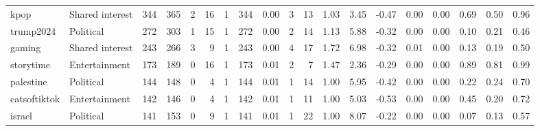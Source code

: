 \begin{tabular}{llrrrrrrrrrrrrrrrrr}
            kpop & Shared interest &    344 &    365 &                           2 &                           16 &             1 &                        344 &     0.00 &    3 &     13 & 1.03 &   3.45 &                              -0.47 &   0.00 &         0.00 &                                0.69 &                                   0.50 &                                     0.96 \\
       trump2024 &       Political &    272 &    303 &                           1 &                           15 &             1 &                        272 &     0.00 &    2 &     14 & 1.13 &   5.88 &                              -0.32 &   0.00 &         0.00 &                                0.10 &                                   0.21 &                                     0.46 \\
          gaming & Shared interest &    243 &    266 &                           3 &                            9 &             1 &                        243 &     0.00 &    4 &     17 & 1.72 &   6.98 &                              -0.32 &   0.01 &         0.00 &                                0.13 &                                   0.19 &                                     0.50 \\
       storytime &   Entertainment &    173 &    189 &                           0 &                           16 &             1 &                        173 &     0.01 &    2 &      7 & 1.47 &   2.36 &                              -0.29 &   0.00 &         0.00 &                                0.89 &                                   0.81 &                                     0.99 \\
       palestine &       Political &    144 &    148 &                           0 &                            4 &             1 &                        144 &     0.01 &    1 &     14 & 1.00 &   5.95 &                              -0.42 &   0.00 &         0.00 &                                0.22 &                                   0.24 &                                     0.70 \\
    catsoftiktok &   Entertainment &    142 &    146 &                           0 &                            4 &             1 &                        142 &     0.01 &    1 &     11 & 1.00 &   5.03 &                              -0.53 &   0.00 &         0.00 &                                0.45 &                                   0.20 &                                     0.72 \\
          israel &       Political &    141 &    153 &                           0 &                            9 &             1 &                        141 &     0.01 &    1 &     22 & 1.00 &   8.07 &                              -0.22 &   0.00 &         0.00 &                                0.07 &                                   0.13 &                                     0.57 \\

\end{tabular}
